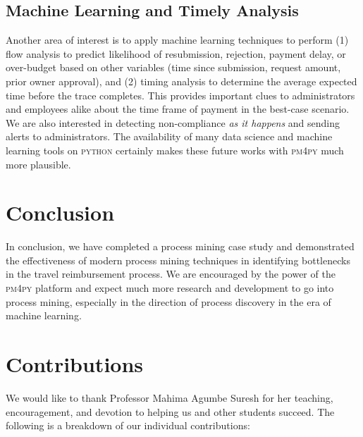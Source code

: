 \documentclass[conference]{IEEEtran}
\begin{document}
\subsection{Machine Learning and Timely
Analysis}

Another area of interest is to apply machine learning techniques to
perform (1) flow analysis to predict likelihood of resubmission,
rejection, payment delay, or over-budget based on other variables (time
since submission, request amount, prior owner approval), and (2) timing
analysis to determine the average expected time before the trace completes.
This provides
important clues to administrators and employees alike about the time
frame of payment in the best-case scenario. We are also interested in
detecting non-compliance \textit{as it happens} and sending alerts to
administrators. The availability of many data science and machine learning
tools on \textsc{python} certainly makes these future works with
\textsc{pm4py} much more plausible.

\section{Conclusion}
\label{section-conclusion}

In conclusion, we have completed a process mining case study and
demonstrated the effectiveness of modern process mining techniques
in identifying bottlenecks in the travel reimbursement
process. We are encouraged by the power of the \textsc{pm4py} platform
and expect much more research and development to go into process mining,
especially in the direction of process discovery in the era of machine learning.


{}


\section{Contributions}

We would like to thank Professor Mahima Agumbe Suresh for her teaching,
encouragement, and devotion to helping us and other students succeed.
The following is a breakdown of our individual contributions:
\end{document}
